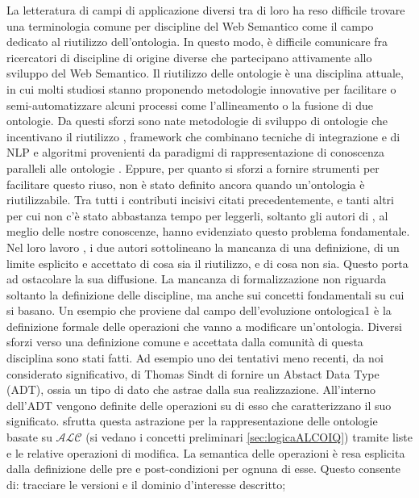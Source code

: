 La letteratura di campi di applicazione diversi tra di loro ha reso difficile trovare una terminologia comune per discipline del Web Semantico come il campo dedicato al riutilizzo dell'ontologia. In questo modo, è difficile comunicare fra ricercatori di discipline di origine diverse che partecipano attivamente allo sviluppo del Web Semantico. Il riutilizzo delle ontologie è una disciplina attuale, in cui molti studiosi stanno proponendo metodologie innovative per facilitare o semi-automatizzare alcuni processi come l'allineamento o la fusione di due ontologie. Da questi sforzi sono nate metodologie di sviluppo di ontologie che incentivano il riutilizzo \cite{NeOn}, framework che combinano tecniche di integrazione e di NLP \cite{caldarolaMultiStrategyApproach} e algoritmi provenienti da paradigmi di rappresentazione di conoscenza paralleli alle ontologie \cite{FCA-Merge}. Eppure, per quanto si sforzi a fornire strumenti per facilitare questo riuso, non è stato definito ancora quando un'ontologia è riutilizzabile. Tra tutti i contributi incisivi citati precedentemente, e tanti altri per cui non c'è stato abbastanza tempo per leggerli, soltanto gli autori di \cite{katsumi2018ontology}, al meglio delle nostre conoscenze, hanno evidenziato questo problema fondamentale. Nel loro lavoro \cite{katsumi2018ontology}, i due autori sottolineano la mancanza di una definizione, di un limite esplicito e accettato di cosa sia il riutilizzo, e di cosa non sia. Questo porta ad ostacolare la sua diffusione. La mancanza di formalizzazione non riguarda soltanto la definizione delle discipline, ma anche sui concetti fondamentali su cui si basano. Un esempio che proviene dal campo dell'evoluzione ontologica1 è la definizione formale delle operazioni che vanno a modificare un'ontologia. Diversi sforzi verso una definizione comune e accettata dalla comunità di questa disciplina sono stati fatti. Ad esempio uno dei tentativi meno recenti, da noi considerato significativo, di Thomas Sindt \cite{...} di fornire un Abstact Data Type (ADT), ossia un tipo di dato che astrae dalla sua realizzazione. All'interno dell'ADT vengono definite delle operazioni su di esso che caratterizzano il suo significato. \cite{...} sfrutta questa astrazione per la rappresentazione delle ontologie basate su $\mathcal{ALC}$ (si vedano i concetti preliminari \autoref{sec:logicaALCOIQ}) tramite liste e le relative operazioni di modifica. La semantica delle operazioni è resa esplicita dalla definizione delle pre e post-condizioni per ognuna di esse. Questo consente di:
tracciare le versioni e il dominio d'interesse descritto;
